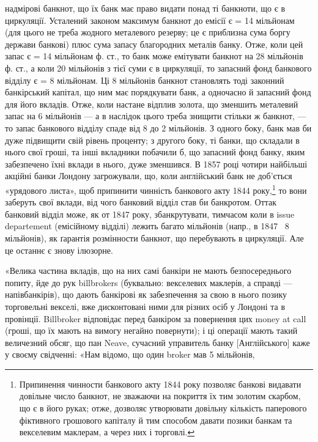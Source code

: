 надмірові банкнот, що їх банк має право видати понад ті банкноти, що є в
циркуляції. Усталений законом максимум банкнот до емісії є = 14 мільйонам
(для цього не треба жодного металевого резерву; це є приблизна сума боргу
держави банкові) плюс сума запасу благородних металів банку. Отже, коли цей запас
є = 14 мільйонам ф. ст., то банк може емітувати банкнот на 28 мільйонів ф. ст.,
а коли 20 мільйонів з тієї суми є в циркуляції, то запасний фонд банкового відділу
є = 8 мільйонам. Ці 8 мільйонів банкнот становлять тоді законний банкірський
капітал, що ним має порядкувати банк, а одночасно й запасний фонд для його
вкладів. Отже, коли настане відплив золота, що зменшить металевий запас на
6 мільйонів — а в наслідок цього треба знищити стільки ж банкнот, — то запас
банкового відділу спаде від 8 до 2 мільйонів. З одного боку, банк мав би дуже
підвищити свій рівень проценту; з другого боку, ті банки, що складали в нього
свої гроші, та інші вкладники побачили б, що запасний фонд банку, яким забезпечено
їхні вклади в нього, дуже зменшився. В 1857 році чотири найбільші
акційні банки Лондону загрожували, що, коли англійський банк не доб’ється «урядового листа», щоб
припинити чинність банкового акту 1844 року,\footnote{Припинення чинности банкового акту 1844 року позволяє банкові видавати довільне число банкнот, не
зважаючи на покриття їх тим золотим скарбом, що є в його руках; отже, дозволяє утворювати довільну
кількість паперового фіктивного грошового капіталу й тим способом давати позики банкам та векселевим
маклерам, а через них і торговлі.} то вони
заберуть свої вклади, від чого банковий відділ став би банкротом. Оттак банковий
відділ може, як от 1847 року, збанкрутувати, тимчасом коли в issue departement
(емісійному відділі) лежить багато мільйонів (напр., в 1847~ 8 мільйонів),
як ґарантія розмінности банкнот, що перебувають в циркуляції. Але це
останнє є знову ілюзорне.

«Велика частина вкладів, що на них самі банкіри не мають безпосереднього
попиту, йде до рук billbrokers (буквально: векселевих маклерів, а справді —
напівбанкірів), що дають банкірові як забезпечення за свою в нього позику
торговельні векселі, вже дисконтовані ними для різних осіб у Лондоні та в
провінції. Billbroker відповідає перед банкіром за повернення цих money at
call (гроші, що їх мають на вимогу негайно повернути); і ці операції мають
такий величезний обсяг, що пан Neave, сучасний управитель банку [Англійського]
каже у своєму свідченні: «Нам відомо, що один broker мав 5 мільйонів,
\parbreak{}  %
